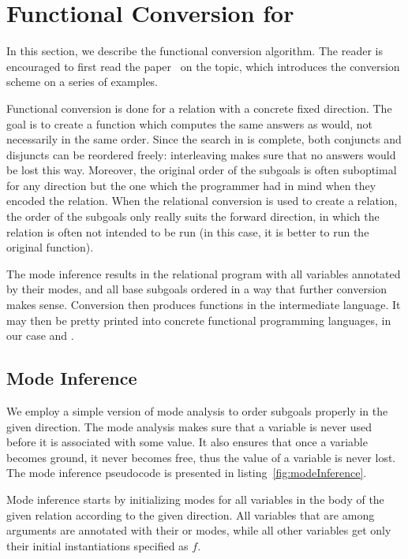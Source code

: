 \section{Functional Conversion for \micro}

In this section, we describe the functional conversion algorithm.
The reader is encouraged to first read the paper~\cite{verbitskaia2022direction} on the topic, which introduces the conversion scheme on a series of examples.

Functional conversion is done for a relation with a concrete fixed direction.
The goal is to create a function which computes the same answers as \micro would, not necessarily in the same order.
Since the search in \micro is complete, both conjuncts and disjuncts can be reordered freely: interleaving makes sure that no answers would be lost this way.
Moreover, the original order of the subgoals is often suboptimal for any direction but the one which the programmer had in mind when they encoded the relation.
When the relational conversion is used to create a relation, the order of the subgoals only really suits the forward direction, in which the relation is often not intended to be run (in this case, it is better to run the original function).

The mode inference results in the relational program with all variables annotated by their modes, and all base subgoals ordered in a way that further conversion makes sense.
Conversion then produces functions in the intermediate language.
It may then be pretty printed into concrete functional programming languages, in our case \haskell and \ocaml.


\subsection{Mode Inference}

We employ a simple version of mode analysis to order subgoals properly in the given direction.
The mode analysis makes sure that a variable is never used before it is associated with some value.
It also ensures that once a variable becomes ground, it never becomes free, thus the value of a variable is never lost.
The mode inference pseudocode is presented in listing~\ref{fig:modeInference}.



Mode inference starts by initializing modes for all variables in the body of the given relation according to the given direction.
All variables that are among arguments are annotated with their \inm or \outm modes, while all other variables get only their initial instantiations specified as $f$.

